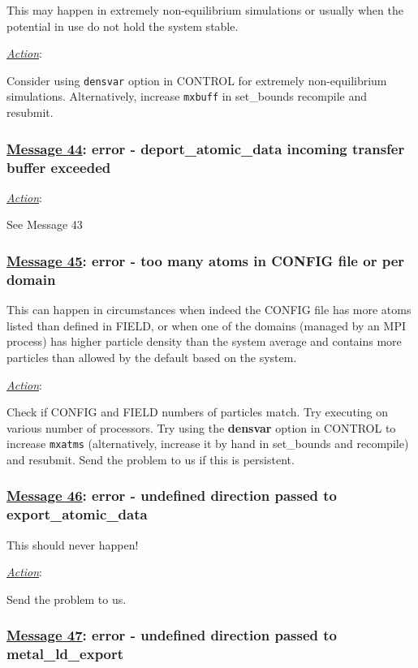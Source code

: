 This may happen in extremely non-equilibrium simulations or
usually when the potential in use do not hold the system stable.

\noindent \underline{\em Action}:

Consider using {\tt densvar} option in CONTROL for extremely
non-equilibrium simulations.  Alternatively, increase {\tt mxbuff}
in {\sc set\_bounds} recompile and resubmit.

\subsubsection*{\underline{Message 44}: error - deport\_atomic\_data incoming transfer buffer exceeded}

\noindent \underline{\em Action}:

See Message 43

\subsubsection*{\underline{Message 45}: error - too many atoms in CONFIG file or per domain}

This can happen in circumstances when indeed the CONFIG file has more
atoms listed than defined in FIELD, or when one of the domains (managed
by an MPI process) has higher particle density than the system average
and contains more particles than allowed by the default based on the
system.

\noindent \underline{\em Action}:

Check if CONFIG and FIELD numbers of particles match.  Try executing on
various number of processors.  Try using the {\bf densvar} option in
CONTROL to increase {\tt mxatms} (alternatively, increase it by hand in
{\sc set\_bounds} and recompile) and resubmit.  Send the problem to us
if this is persistent.

\subsubsection*{\underline{Message 46}: error - undefined direction passed to export\_atomic\_data}

This should never happen!

\noindent \underline{\em Action}:

Send the problem to us.

\subsubsection*{\underline{Message 47}: error - undefined direction passed to metal\_ld\_export}

